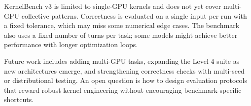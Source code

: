 KernelBench v3 is limited to single-GPU kernels and does not yet cover multi-GPU collective patterns. Correctness is evaluated on a single input per run with a fixed tolerance, which may miss some numerical edge cases. The benchmark also uses a fixed number of turns per task; some models might achieve better performance with longer optimization loops.

Future work includes adding multi-GPU tasks, expanding the Level 4 suite as new architectures emerge, and strengthening correctness checks with multi-seed or distributional testing. An open question is how to design evaluation protocols that reward robust kernel engineering without encouraging benchmark-specific shortcuts.
